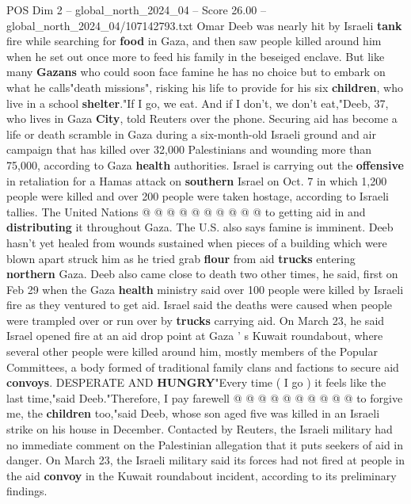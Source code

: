 \begin{textsample}{POS Dim 2 – global\_north\_2024\_04 – Score 26.00 – global\_north\_2024\_04/107142793.txt}  \label{ex:f2_pos_269}
Omar Deeb was nearly hit by Israeli \textbf{tank} fire while searching for \textbf{food} in Gaza, and then saw people killed around him when he set out once more to feed his family in the beseiged enclave.
But like many \textbf{Gazans} who could soon face famine he has no choice but to embark on what he calls"death missions", risking his life to provide for his six \textbf{children}, who live in a school \textbf{shelter}."If I go, we eat.
And if I don't, we don't eat,"Deeb, 37, who lives in Gaza \textbf{City}, told Reuters over the phone.
Securing aid has become a life or death scramble in Gaza during a six-month-old Israeli ground and air campaign that has killed over 32,000 Palestinians and wounding more than 75,000, according to Gaza \textbf{health} authorities.
Israel is carrying out the \textbf{offensive} in retaliation for a Hamas attack on \textbf{southern} Israel on Oct. 7 in which 1,200 people were killed and over 200 people were taken hostage, according to Israeli tallies.
The United Nations @ @ @ @ @ @ @ @ @ @ to getting aid in and \textbf{distributing} it throughout Gaza.
The U.S. also says famine is imminent.
Deeb hasn't yet healed from wounds sustained when pieces of a building which were blown apart struck him as he tried grab \textbf{flour} from aid \textbf{trucks} entering \textbf{northern} Gaza.
Deeb also came close to death two other times, he said, first on Feb 29 when the Gaza \textbf{health} ministry said over 100 people were killed by Israeli fire as they ventured to get aid.
Israel said the deaths were caused when people were trampled over or run over by \textbf{trucks} carrying aid.
On March 23, he said Israel opened fire at an aid drop point at Gaza ' s Kuwait roundabout, where several other people were killed around him, mostly members of the Popular Committees, a body formed of traditional family clans and factions to secure aid \textbf{convoys}.
DESPERATE AND \textbf{HUNGRY}"Every time ( I go ) it feels like the last time,"said Deeb."Therefore, I pay farewell @ @ @ @ @ @ @ @ @ @ to forgive me, the \textbf{children} too,"said Deeb, whose son aged five was killed in an Israeli strike on his house in December.
Contacted by Reuters, the Israeli military had no immediate comment on the Palestinian allegation that it puts seekers of aid in danger.
On March 23, the Israeli military said its forces had not fired at people in the aid \textbf{convoy} in the Kuwait roundabout incident, according to its preliminary findings.

\end{textsample}
